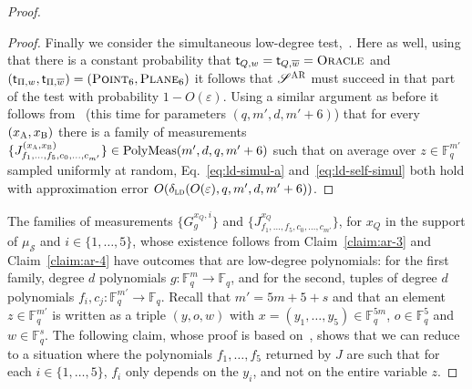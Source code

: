 \documentclass[11pt]{article}
\theoremstyle{definition}
\newcommand{\ol}[1]{\overline{#1}}
\newcommand{\F}{\ensuremath{\mathbb{F}}}
\newcommand{\ld}{\textsc{ld}}
\newcommand{\eps}{\varepsilon}
\newcommand{\sampler}{\mathcal{S}}
\newcommand{\strategy}{\mathscr{S}}
\newcommand{\gamestyle}[1]{\ensuremath{\textsc{#1}}\xspace}
\newcommand{\ar}{\gamestyle{AR}}
\newcommand{\labelstyle}[1]{\ensuremath{\textsc{#1}}\xspace}
\newcommand{\tvarstyle}[1]{\mathsf{#1}}
\newcommand{\tvar}{\ensuremath{\tvarstyle{t}}}
\newcommand{\alice}{\labelstyle{A}}
\newcommand{\bob}{\labelstyle{B}}
\newcommand{\oracle}{\labelstyle{Oracle}}
\newcommand{\typestyle}[1]{\ensuremath{\textsc{#1}}\xspace}
\newcommand{\Plane}{\typestyle{Plane}}
\newcommand{\Point}{\typestyle{Point}}
\newcommand{\simulpolymeas}[4]{\mathrm{PolyMeas}(#1,#2,#3, #4)}
\begin{document}
\begin{proof}
\begin{proof}
    Finally we consider the simultaneous low-degree
    test,~.
    Here as well, using that there is a constant probability that $\tvar_{Q,w} =
    \tvar_{Q,\ol{w}} = \oracle$ and $(\tvar_{\Pi,w}, \tvar_{\Pi, \ol{w}}) =
    (\Point_6, \Plane_6)$ it follows that $\strategy^\ar$ must succeed in that
    part of the test with probability $1-O(\eps)$.
    Using a similar argument as before it follows from~
    (this time for parameters $(q,m',d,m'+6)$) that for every
    $(x_\alice,x_\bob)$ there is a family of measurements $\{J^{({x}_\alice,
      {x}_\bob)}_{f_1, \dots, f_5, c_0, \dots, c_{m'}}\} \in
    \simulpolymeas{m'}{d}{q}{m'+6}$ such that on average over $z\in \F_q^{m'}$ sampled
    uniformly at random, Eq.~\eqref{eq:ld-simul-a} and~\eqref{eq:ld-self-simul}
    both hold with approximation error $O(\delta_{\ld}(O({\eps}), q, m', d,
    m'+6))$.
  \end{proof}

  The families of measurements $\{G^{x_Q,i}_g\}$ and
  $\{J^{x_Q}_{f_1,\ldots,f_5,c_0,\ldots,c_{m'}}\}$, for $x_Q$ in the support of
  $\mu_\sampler$ and $i\in\{1,\ldots,5\}$, whose existence follows from
  Claim~\ref{claim:ar-3} and Claim~\ref{claim:ar-4} have outcomes that are
  low-degree polynomials: for the first family, degree $d$ polynomials
  $g:\F_q^m\to \F_q$, and for the second, tuples of degree $d$ polynomials
  $f_i,c_j:\F_q^{m'} \to \F_q$.
  Recall that $m' = 5m + 5 +s$ and that an element $z\in \F_q^{m'}$ is written
  as a triple $(y,o,w)$ with $x=(y_1,\ldots,y_5)\in \F_q^{5m}$, $o\in\F_q^5$ and
  $w\in\F_q^s$.
  The following claim, whose proof is based on~, shows
  that we can reduce to a situation where the polynomials $f_1,\ldots,f_5$
  returned by $J$ are such that for each $i\in \{1,\ldots,5\}$, $f_i$ only
  depends on the $y_i$, and not on the entire variable $z$.
	

\end{proof}
\end{document}
